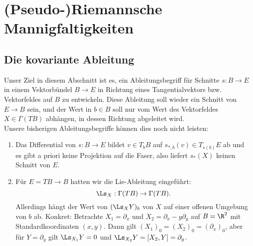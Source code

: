 \section{(Pseudo-)Riemannsche Mannigfaltigkeiten}
\label{sec:riemann}
\subsection{Die kovariante Ableitung}
\label{subsec:kovabl}
Unser Ziel in diesem Abschnitt ist es, ein Ableitungsbegriff für Schnitte $s: B \to E$ in einem Vektorbündel $B \to E$ in Richtung eines Tangentialvektors bzw. Vektorfeldes auf $B$ zu entwickeln. Diese Ableitung soll wieder ein Schnitt von $E \to B$ sein, und der Wert in $b \in B$ soll nur vom Wert des Vektorfeldes $X \in \Gamma (TB)$ abhängen, in dessen Richtung abgeleitet wird.\\
Unsere bisherigen Ableitungsbegriffe können dies noch nicht leisten:
\begin{enumerate}
\item Das Differential von $s: B \to E$ bildet $v \in T_bB$ auf $s_{\ast, b}(v) \in T_{s(b)} E$ ab und es gibt a priori keine Projektion auf die Faser, also liefert $s_\ast (X)$ keinen Schnitt von $E$.
\item Für $E = TB \to B$ hatten wir die Lie-Ableitung eingeführt:
\begin{equation}
\Ls_X: \Gamma (TB) \to \Gamma (TB).
\end{equation}
Allerdings hängt der Wert von $(\Ls_X Y)_b$ von $X$ auf einer offenen Umgebung von $b$ ab. Konkret: Betrachte $X_1=\partial_x$ und $X_2 = \partial_x - y \partial_y$ auf $B = \R^2$ mit Standardkoordinaten $(x, y)$. Dann gilt $(X_1)_0 = (X_2)_0 = (\partial_x)_0$, aber für $Y = \partial_y$ gilt $\Ls_{X_1} Y = 0$ und $\Ls_{X_2} Y = [X_2, Y] = \partial_y$.
\end{enumerate}
